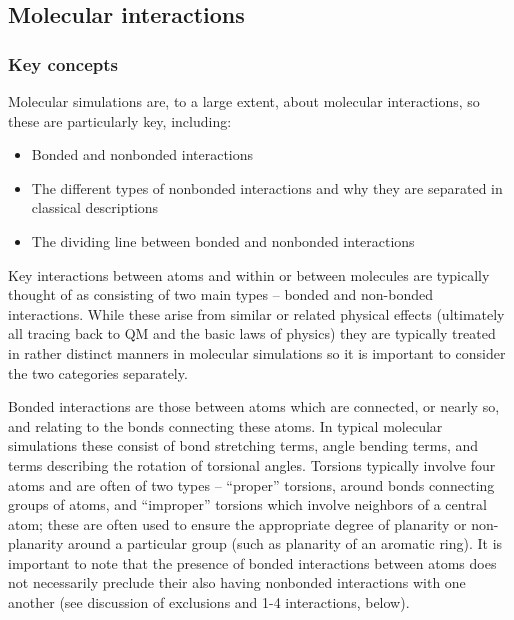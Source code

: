 \documentclass[9pt,bestpractices]{livecoms}
\begin{document}
\subsection{Molecular interactions}
\label{sec:mol_interactions}
\subsubsection{Key concepts}
Molecular simulations are, to a large extent, about molecular interactions, so these are particularly key, including:
\begin{itemize}
\item Bonded and nonbonded interactions
\item The different types of nonbonded interactions and why they are separated in classical descriptions
\item The dividing line between bonded and nonbonded interactions
\end{itemize}

Key interactions between atoms and within or between molecules are typically thought of as consisting of two main types -- bonded and non-bonded interactions. 
While these arise from similar or related physical effects (ultimately all tracing back to QM and the basic laws of physics) they are typically treated in rather distinct manners in molecular simulations so it is important to consider the two categories
separately.

Bonded interactions are those between atoms which are connected, or nearly so, and relating to the bonds connecting these atoms. 
In typical molecular simulations these consist of bond stretching terms, angle bending terms, and terms describing the rotation of torsional angles. 
Torsions typically involve four atoms and are often of two types -- ``proper'' torsions, around bonds connecting groups of atoms, and ``improper''
torsions which involve neighbors of a central atom; these are often used to ensure the appropriate degree of planarity or non-planarity around a particular group (such as planarity of an aromatic ring). 
It is important to note that the presence of bonded interactions between atoms does not necessarily preclude their also having nonbonded interactions with one another (see discussion of exclusions and 1-4 interactions, below).
\end{document}
